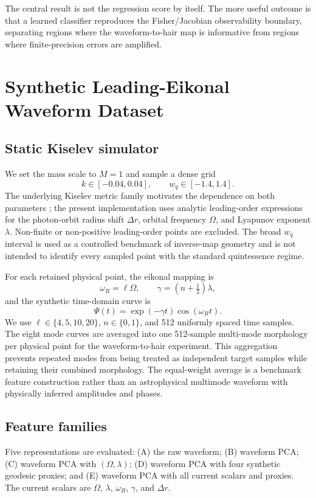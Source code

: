 \documentclass[conference]{IEEEtran}
\newcommand{\wq}{w_q}
\begin{document}
The central result is not the regression score by itself. The more useful
outcome is that a learned classifier reproduces the Fisher/Jacobian
observability boundary, separating regions where the waveform-to-hair map is
informative from regions where finite-precision errors are amplified.

\section{Synthetic Leading-Eikonal Waveform Dataset}
\subsection{Static Kiselev simulator}
We set the mass scale to $M=1$ and sample a dense grid
\begin{equation}
 k\in[-0.04,0.04], \qquad \wq\in[-1.4,1.4].
\end{equation}
The underlying Kiselev metric family motivates the dependence on both
parameters \cite{kiselev2003quintessence}; the present implementation uses
analytic leading-order expressions for the photon-orbit radius shift
$\Delta r$, orbital frequency $\Omega$, and Lyapunov exponent $\lambda$.
Non-finite or non-positive leading-order points are excluded.
The broad $\wq$ interval is used as a controlled benchmark of inverse-map
geometry and is not intended to identify every sampled point with the standard
quintessence regime.

For each retained physical point, the eikonal mapping is
\begin{equation}
 \omega_R=\ell\Omega,\qquad
 \gamma=(n+\tfrac{1}{2})\lambda ,
\end{equation}
and the synthetic time-domain curve is
\begin{equation}
 \Psi(t)=\exp(-\gamma t)\cos(\omega_R t).
 \label{eq:ringdown}
\end{equation}
We use $\ell\in\{4,5,10,20\}$, $n\in\{0,1\}$, and 512 uniformly spaced time
samples. The eight mode curves are averaged into one 512-sample multi-mode
morphology per physical point for the waveform-to-hair experiment. This
aggregation prevents repeated modes from being treated as independent target
samples while retaining their combined morphology. The equal-weight average is
a benchmark feature construction rather than an astrophysical multimode
waveform with physically inferred amplitudes and phases.

\subsection{Feature families}
Five representations are evaluated: (A) the raw waveform; (B) waveform PCA;
(C) waveform PCA with $(\Omega,\lambda)$; (D) waveform PCA with four synthetic
geodesic proxies; and (E) waveform PCA with all current scalars and proxies.
The current scalars are $\Omega$, $\lambda$, $\omega_R$, $\gamma$, and
$\Delta r$.
\end{document}
